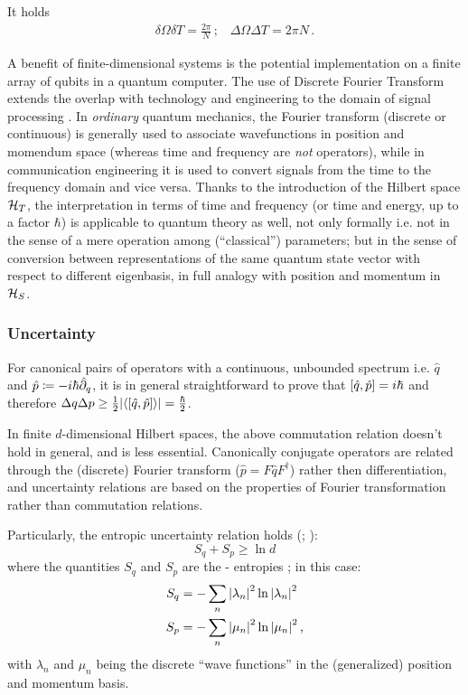 It holds
\begin{gather}
  \delta\Omega \delta T = \frac{2\pi}{N} \, \text{;} \quad
  \Delta\Omega \Delta T = 2\pi N \, \text{.}
\end{gather}

A benefit of finite-dimensional systems is the potential implementation on a finite array of
qubits in a quantum computer. The use of Discrete Fourier Transform extends the overlap
with technology and engineering to the domain of signal processing \parencite{FiniteHilb}.
In \emph{ordinary} quantum mechanics, the Fourier transform (discrete or continuous)
is generally used
to associate wavefunctions in position and momendum space
(whereas time and frequency are \emph{not} operators),
while in communication engineering it is used to convert signals
from the time to the frequency domain and vice versa.
Thanks to the introduction of the Hilbert space $\mathcal{H}_T$,
the interpretation in terms of time and frequency
(or time and energy, up to a factor $\hbar$)
is applicable to quantum theory as well, not only formally
i.e. not in the sense of a mere operation among (``classical'') parameters;
but in the sense of conversion between representations of the
same quantum state vector with respect to different eigenbasis,
in full analogy with position and momentum in $\mathcal{H}_S$.

\subsubsection{Uncertainty}

For canonical pairs of operators with a continuous, unbounded spectrum i.e.
$\hat{q}$ and $\hat{p} \coloneq -i\hbar\hat{\partial}_{q}$,
it is in general straightforward to prove that
$\qty[\hat{q}, \hat{p}] = i\hbar$ and therefore
$\Delta q \Delta p \geq {\frac{1}{2} \qty|\ev{\qty[\hat{q}, \hat{p}]}| = \frac{\hbar}{2}}$.

In finite $d$-dimensional Hilbert spaces, the above commutation relation doesn't hold
in general, and is less essential.
Canonically conjugate operators are related
through the (discrete) Fourier transform ($\hat{p} = F\hat{q}F^{\dagger}$)
rather then differentiation,
and uncertainty relations are based on
the properties of Fourier transformation
rather than commutation relations.

Particularly, the entropic uncertainty relation holds
(\cite[\S 2.4]{FiniteHilb}; \cite{Deutsch:Uncertainty}):
\begin{equation}
  S_q + S_p \geq \ln d
\end{equation}
where the quantities $S_q$ and $S_p$ are the - entropies
\parencite[\S {\it I}.A]{Wehner:Uncertainty}; in this case:
\begin{align}
  S_q &= -\sum_n \qty|\lambda_n |^2  \ln\qty|\lambda_n|^2 \\
  S_p &= -\sum_n \qty|\mu_n     |^2  \ln\qty|\mu_n    |^2
  \,\text{,}
\end{align}
with $\lambda_n$ and $\mu_n$ being the discrete ``wave functions'' in the
(generalized) position and momentum basis.

